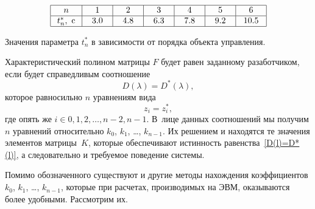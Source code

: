 \documentclass[12pt,a4paper,openany]{extarticle}
\begin{document}
\begin{table}[h!]
	\begin{equation*}
		\begin{array}{|c|c|c|c|c|c|c|}\hline
			\phantom{aa}n\phantom{aa} & \phantom{aa}1\phantom{aa} & \phantom{aa}2\phantom{aa} & \phantom{aa}3\phantom{aa} & \phantom{aa}4\phantom{aa} & \phantom{aa}5\phantom{aa} & \phantom{aa}6\phantom{aa} \\ \hline
			t_n^*,\text{ c} & 3.0 & 4.8 & 6.3 & 7.8 & 9.2 & 10.5 \\\hline
		\end{array}
	\end{equation*}
	\caption{Значения параметра $t_n^*$ в зависимости от порядка объекта управления.}
	\label{tabl}
\end{table}

Характеристический полином матрицы $F$ будет равен заданному разаботчиком, если будет справедливым соотношение
\begin{equation}\label{D(l)=D*(l)}
	D(\lambda) = D^*(\lambda),
\end{equation}
которое равносильно $n$ уравнениям вида
\begin{equation}
	z_i = z_i^*,
\end{equation}
где опять же $i\in{0,1,2,\dots,n-2, n-1}$.
В~лице данных соотношений мы получим $n$ уравнений относительно $k_0$, $k_1$, \ldots, $k_{n-1}$.
Их решением и находятся те значения элементов матрицы~$K$, которые обеспечивают истинность равенства~\eqref{D(l)=D*(l)}, а следовательно и требуемое поведение системы. 

Помимо обозначенного существуют и другие методы нахождения коэффициентов $k_0$, $k_1$, \ldots, $k_{n-1}$, которые при расчетах, производимых на ЭВМ, оказываются более удобными.
Рассмотрим их.
\end{document}
